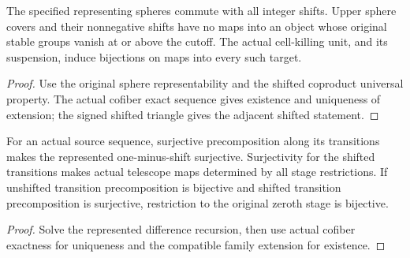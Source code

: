 \begin{proposition}
  \label{prop:actual-upper-cell-orthogonality}
  \leanok
  The specified representing spheres commute with all integer shifts. Upper sphere covers and their nonnegative shifts have no maps into an object whose original stable groups vanish at or above the cutoff. The actual cell-killing unit, and its suspension, induce bijections on maps into every such target.
\end{proposition}
\begin{proof}
  Use the original sphere representability and the shifted coproduct universal property. The actual cofiber exact sequence gives existence and uniqueness of extension; the signed shifted triangle gives the adjacent shifted statement.
  \leanok
\end{proof}

\begin{proposition}
  \label{prop:actual-milnor-represented-extension}
  \leanok
  For an actual source sequence, surjective precomposition along its transitions makes the represented one-minus-shift surjective. Surjectivity for the shifted transitions makes actual telescope maps determined by all stage restrictions. If unshifted transition precomposition is bijective and shifted transition precomposition is surjective, restriction to the original zeroth stage is bijective.
\end{proposition}
\begin{proof}
  Solve the represented difference recursion, then use actual cofiber exactness for uniqueness and the compatible family extension for existence.
  \leanok
\end{proof}

